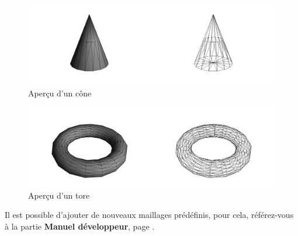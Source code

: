 \documentclass[a4paper]{memoir}
\begin{document}
			\begin{figure}[H]
				\hspace{-2cm} \includegraphics[scale=0.27]{img/cone.png}
				\caption{Aperçu d'un cône}
			\end{figure}
			\begin{figure}[H]
				\vspace{-0,5cm} \hspace{-2cm} \includegraphics[scale=0.27]{img/torus.png}
				\caption{Aperçu d'un tore}
			\end{figure}
			Il est possible d'ajouter de nouveaux maillages prédéfinis, pour cela, référez-vous à la partie \textbf{Manuel développeur}, page 
			\pageref{man-dev}.
			
\end{document}
